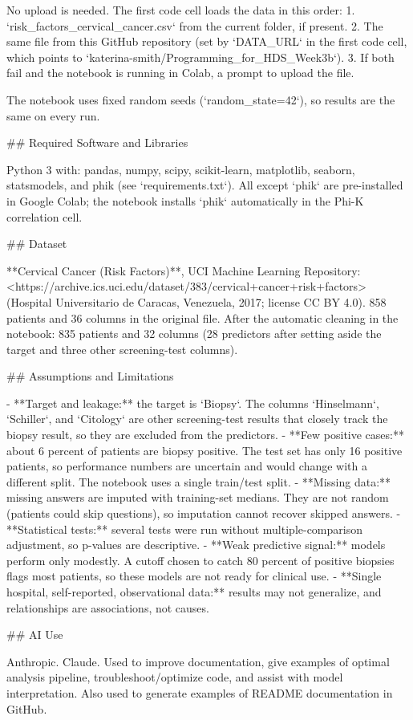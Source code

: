 No upload is needed. The first code cell loads the data in this order:
1. `risk_factors_cervical_cancer.csv` from the current folder, if present.
2. The same file from this GitHub repository (set by `DATA_URL` in the first code cell, which points to `katerina-smith/Programming_for_HDS_Week3b`).
3. If both fail and the notebook is running in Colab, a prompt to upload the file.

The notebook uses fixed random seeds (`random_state=42`), so results are the same on every run.

## Required Software and Libraries

Python 3 with: pandas, numpy, scipy, scikit-learn, matplotlib, seaborn, statsmodels, and phik
(see `requirements.txt`). All except `phik` are pre-installed in Google Colab; the notebook
installs `phik` automatically in the Phi-K correlation cell.

## Dataset

**Cervical Cancer (Risk Factors)**, UCI Machine Learning Repository:
<https://archive.ics.uci.edu/dataset/383/cervical+cancer+risk+factors>
(Hospital Universitario de Caracas, Venezuela, 2017; license CC BY 4.0).
858 patients and 36 columns in the original file. After the automatic cleaning in the
notebook: 835 patients and 32 columns (28 predictors after setting aside the target and
three other screening-test columns).

## Assumptions and Limitations

- **Target and leakage:** the target is `Biopsy`. The columns `Hinselmann`, `Schiller`, and
  `Citology` are other screening-test results that closely track the biopsy result, so they
  are excluded from the predictors.
- **Few positive cases:** about 6 percent of patients are biopsy positive. The test set has only 16
  positive patients, so performance numbers are uncertain and would change with a different
  split. The notebook uses a single train/test split.
- **Missing data:** missing answers are imputed with training-set medians. They are not
  random (patients could skip questions), so imputation cannot recover skipped answers.
- **Statistical tests:** several tests were run without multiple-comparison adjustment, so
  p-values are descriptive.
- **Weak predictive signal:** models perform only modestly. A cutoff chosen to catch 80 percent of
  positive biopsies flags most patients, so these models are not ready for clinical use.
- **Single hospital, self-reported, observational data:** results may not generalize, and
  relationships are associations, not causes.
  
  ## AI Use
  
Anthropic. Claude. Used to improve documentation, give examples of optimal 
analysis pipeline, troubleshoot/optimize code, and assist with model interpretation. 
Also used to generate examples of README documentation in GitHub.

